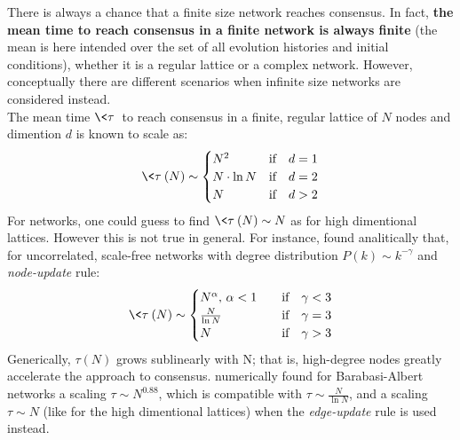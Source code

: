 There is always a chance that a finite size network reaches consensus. In fact, \textbf{the mean time to reach consensus in a finite network is always finite} (the mean is here intended over the set of all evolution histories and initial conditions), whether it is a regular lattice or a complex network. However, conceptually there are different scenarios when infinite size networks are considered instead.\\
The mean time $\<\tau\>$ to reach consensus in a finite, regular lattice of $N$ nodes and dimention $d$ is known \cite{} to scale as:
\begin{equation*}
    \<\tau\>(N) \sim
    \begin{cases}
        N^2 \quad &\text{if}\quad d=1 \\
        N\cdot \ln{N} &\text{if}\quad d=2 \\
        N &\text{if}\quad d>2 \\
    \end{cases}
\end{equation*}
For networks, one could guess to find $\<\tau\>(N) \sim N$ as for high dimentional lattices. However this is not true in general. For instance, \cite{sood} found analitically that, for uncorrelated, scale-free networks with degree distribution $P(k)\sim k^{-\gamma}$ and \textit{node-update} rule:
\begin{equation*}
    \<\tau\>(N) \sim
        \begin{cases}
         N^{\alpha}, \, \alpha<1 \quad &\text{if}\quad \gamma < 3 \\
        \frac{N}{\ln{N}} &\text{if}\quad \gamma = 3 \\
         N &\text{if}\quad \gamma > 3 \\
    \end{cases}
\end{equation*}
Generically, $\tau(N)$ grows sublinearly with N; that is, high-degree nodes greatly accelerate the approach to consensus. \cite{suchecki_numerical} numerically found for Barabasi-Albert networks a scaling $\tau \sim N^{0.88}$, which is compatible with $\tau \sim \frac{N}{\ln{N}}$, and a scaling $\tau \sim N$ (like for the high dimentional lattices) when the \textit{edge-update} rule is used instead.
